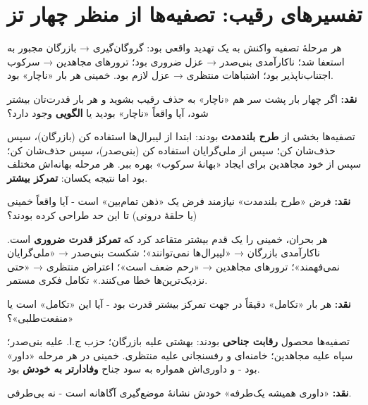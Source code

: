 \documentclass[12pt,a4paper]{book}
\newcommand{\keyword}[1]{\textbf{\textcolor{cPrimary}{#1}}}
\begin{document}
\section{تفسیرهای رقیب: تصفیه‌ها از منظر چهار تز}

\begin{principleBox}
\begin{description}[style=nextline, font=\bfseries\color{cPrimary}]
    \item[تز ۱ (صداقت + اجبار)]
    هر مرحلهٔ تصفیه واکنش به یک تهدید واقعی بود: گروگان‌گیری → بازرگان مجبور به استعفا شد؛ ناکارآمدی بنی‌صدر → عزل ضروری بود؛ ترورهای مجاهدین → سرکوب اجتناب‌ناپذیر بود؛ اشتباهات منتظری → عزل لازم بود. خمینی هر بار «ناچار» بود.

    \textbf{نقد:} اگر چهار بار پشت سر هم «ناچار» به حذف رقیب بشوید و هر بار قدرت‌تان بیشتر شود، آیا واقعاً «ناچار» بودید یا \keyword{الگویی} وجود دارد؟

    \item[تز ۲ (خدعه)]
    تصفیه‌ها بخشی از \keyword{طرح بلندمدت} بودند: ابتدا از لیبرال‌ها استفاده کن (بازرگان)، سپس حذف‌شان کن؛ سپس از ملی‌گرایان استفاده کن (بنی‌صدر)، سپس حذف‌شان کن؛ سپس از خود مجاهدین برای ایجاد «بهانهٔ سرکوب» بهره ببر. هر مرحله بهانه‌اش مختلف بود اما نتیجه یکسان: \keyword{تمرکز بیشتر}.

    \textbf{نقد:} فرض «طرح بلندمدت» نیازمند فرض یک «ذهن تمام‌بین» است - آیا واقعاً خمینی (یا حلقهٔ درونی) تا این حد طراحی کرده بودند؟

    \item[تز ۳ (تکامل)]
    هر بحران، خمینی را یک قدم بیشتر متقاعد کرد که \keyword{تمرکز قدرت ضروری} است. ناکارآمدی بازرگان → «لیبرال‌ها نمی‌توانند»؛ شکست بنی‌صدر → «ملی‌گرایان نمی‌فهمند»؛ ترورهای مجاهدین → «رحم ضعف است»؛ اعتراض منتظری → «حتی نزدیک‌ترین‌ها خطا می‌کنند.» تکامل فکری مستمر.

    \textbf{نقد:} هر بار «تکامل» دقیقاً در جهت تمرکز بیشتر قدرت بود - آیا این «تکامل» است یا «منفعت‌طلبی»؟

    \item[تز ۴ (فشار نخبگان)]
    تصفیه‌ها محصول \keyword{رقابت جناحی} بودند: بهشتی علیه بازرگان؛ حزب ج.ا. علیه بنی‌صدر؛ سپاه علیه مجاهدین؛ خامنه‌ای و رفسنجانی علیه منتظری. خمینی در هر مرحله «داور» بود - و داوری‌اش همواره به سود جناح \keyword{وفادارتر به خودش} بود.

    \textbf{نقد:} «داوری همیشه یک‌طرفه» خودش نشانهٔ موضع‌گیری آگاهانه است - نه بی‌طرفی.
\end{description}
\end{principleBox}
\end{document}
